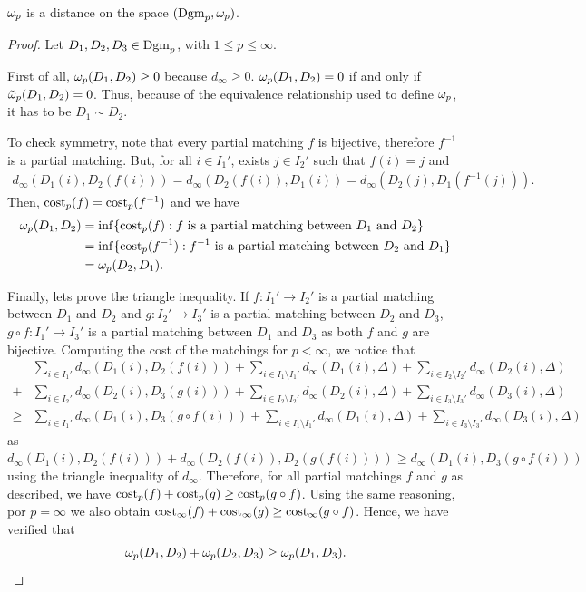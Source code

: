 \begin{proposition}
    $\omega_p$ is a distance on the space $ (\operatorname{Dgm}_p, \omega_p) $.
\end{proposition}
\begin{proof}
    Let $ D_1, D_2, D_3 \in \operatorname{Dgm}_p$, with $ 1 \leq p \leq \infty $.

    First of all, $ \omega_p (D_1, D_2) \geq 0 $ because $ d_\infty \geq 0 $. $ \omega_p (D_1, D_2) = 0 $ if and only if $ \tilde \omega_p (D_1, D_2) = 0 $. Thus, because of the equivalence relationship used to define $ \omega_p $, it has to be $ D_1 \sim D_2 $.

    To check symmetry, note that every partial matching $ f $ is bijective, therefore $ f^{-1} $ is a partial matching. But, for all $ i \in I_1'$, exists $ j \in I_2' $ such that $ f(i) = j $ and
    \begin{align*}
        d_\infty (D_1(i), D_2(f(i))) = d_\infty (D_2(f(i)), D_1(i)) = d_\infty (D_2(j), D_1(f^{-1}(j))).
    \end{align*}
    Then, $ \operatorname{cost}_p(f) = \operatorname{cost}_p(f^{-1}) $ and we have
    \begin{align*}
        \omega_p (D_1, D_2) &= \inf \{\operatorname{cost}_p(f) : f \text{ is a partial matching between } D_1 \text{ and } D_2 \} \\
        &= \inf \{\operatorname{cost}_p(f^{-1}) : f^{-1} \text{ is a partial matching between } D_2 \text{ and } D_1 \} \\
        &= \omega_p (D_2, D_1).
    \end{align*}
    
    Finally, lets prove the triangle inequality. If $ f: I_1' \to I_2' $ is a partial matching between $ D_1 $ and $ D_2 $ and $ g: I_2' \to I_3' $ is a partial matching between $ D_2 $ and $ D_3 $, $ g \circ f: I_1' \to I_3' $ is a partial matching between $ D_1 $ and $ D_3 $ as both $ f $ and $ g $ are bijective. Computing the cost of the matchings for $ p < \infty$, we notice that
    \begin{align*}
        &\sum_{i\in I_1'} d_\infty(D_1(i), D_2(f(i))) + \sum_{i\in I_1 \setminus I_1'} d_\infty(D_1(i), \Delta) + \sum_{i\in I_2 \setminus I_2'} d_\infty(D_2(i), \Delta) \\
        + &\sum_{i\in I_2'} d_\infty(D_2(i), D_3(g(i))) + \sum_{i\in I_2 \setminus I_2'} d_\infty(D_2(i), \Delta) + \sum_{i\in I_3 \setminus I_3'} d_\infty(D_3(i), \Delta) \\
        \geq &\sum_{i\in I_1'} d_\infty(D_1(i), D_3(g \circ f(i))) + \sum_{i\in I_1 \setminus I_1'} d_\infty(D_1(i), \Delta) + \sum_{i\in I_3 \setminus I_3'} d_\infty(D_3(i), \Delta)
    \end{align*}
    as $ d_\infty(D_1(i), D_2(f(i))) + d_\infty(D_2(f(i)), D_2(g(f(i)))) \geq d_\infty(D_1(i), D_3(g \circ f(i))) $ using the triangle inequality of $ d_\infty $. Therefore, for all partial matchings $ f $ and $ g $ as described, we have $ \operatorname{cost}_p (f) + \operatorname{cost}_p (g) \geq \operatorname{cost}_p (g \circ f) $. Using the same reasoning, por $ p = \infty $ we also obtain $ \operatorname{cost}_\infty (f) + \operatorname{cost}_\infty (g) \geq \operatorname{cost}_\infty (g \circ f) $. Hence, we have verified that
    \begin{align*}
        \omega_p(D_1, D_2) + \omega_p(D_2, D_3) \geq \omega_p(D_1, D_3).
    \end{align*}
\end{proof}

